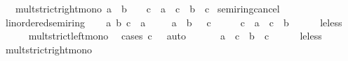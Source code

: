 \begin{isabellebody}
\ \ \ mult{\isacharunderscore}{\kern0pt}strict{\isacharunderscore}{\kern0pt}right{\isacharunderscore}{\kern0pt}mono{\isacharcolon}{\kern0pt}\ {\isachardoublequoteopen}a\ {\isacharless}{\kern0pt}\ b\ {\isasymLongrightarrow}\ {}\ {\isacharless}{\kern0pt}\ c\ {\isasymLongrightarrow}\ a\ {\isacharasterisk}{\kern0pt}\ c\ {\isacharless}{\kern0pt}\ b\ {\isacharasterisk}{\kern0pt}\ c{\isachardoublequoteclose}\isanewline
{}\isanewline
\isanewline
{}\isamarkupfalse%
\ semiring{\isacharunderscore}{\kern0pt}{}{\isacharunderscore}{\kern0pt}cancel%
\isadelimproof
\ %
\endisadelimproof
%
\isatagproof
\isacommand{{\isachardot}{\kern0pt}{\isachardot}{\kern0pt}}\isamarkupfalse%
%
\endisatagproof
{\isafoldproof}%
%
\isadelimproof
%
\endisadelimproof
\isanewline
\isanewline
{}\isamarkupfalse%
\ linordered{\isacharunderscore}{\kern0pt}semiring\isanewline
%
\isadelimproof
%
\endisadelimproof
%
\isatagproof
{}\isamarkupfalse%
\isanewline
\ \ \isamarkupfalse%
\ a\ b\ c\ {\isacharcolon}{\kern0pt}{\isacharcolon}{\kern0pt}\ {\isacharprime}{\kern0pt}a\isanewline
\ \ \isamarkupfalse%
\ {\isacharasterisk}{\kern0pt}{\isacharcolon}{\kern0pt}\ {\isachardoublequoteopen}a\ {\isasymle}\ b{\isachardoublequoteclose}\ {\isachardoublequoteopen}{}\ {\isasymle}\ c{\isachardoublequoteclose}\isanewline
\ \ \isamarkupfalse%
\ \isamarkupfalse%
\ {\isachardoublequoteopen}c\ {\isacharasterisk}{\kern0pt}\ a\ {\isasymle}\ c\ {\isacharasterisk}{\kern0pt}\ b{\isachardoublequoteclose}\isanewline
\ \ \ \ \isamarkupfalse%
\ le{\isacharunderscore}{\kern0pt}less\isanewline
\ \ \ \ \isamarkupfalse%
\ mult{\isacharunderscore}{\kern0pt}strict{\isacharunderscore}{\kern0pt}left{\isacharunderscore}{\kern0pt}mono\ \isamarkupfalse%
\ {\isacharparenleft}{\kern0pt}cases\ {\isachardoublequoteopen}c\ {\isacharequal}{\kern0pt}\ {}{\isachardoublequoteclose}{\isacharparenright}{\kern0pt}\ auto\isanewline
\ \ \isamarkupfalse%
\ {\isacharasterisk}{\kern0pt}\ \isamarkupfalse%
\ {\isachardoublequoteopen}a\ {\isacharasterisk}{\kern0pt}\ c\ {\isasymle}\ b\ {\isacharasterisk}{\kern0pt}\ c{\isachardoublequoteclose}\isanewline
\ \ \ \ \isamarkupfalse%
\ le{\isacharunderscore}{\kern0pt}less\isanewline
\ \ \ \ \isamarkupfalse%
\ mult{\isacharunderscore}{\kern0pt}strict{\isacharunderscore}{\kern0pt}right{\isacharunderscore}{\kern0pt}mono\ \isamarkupfalse%

\end{isabellebody}
